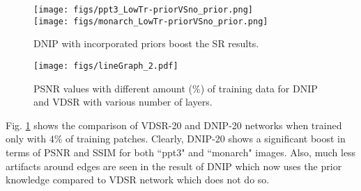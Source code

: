 \documentclass[9pt]{article}
\begin{document}
\begin{figure}[t!]
  \centering
  \texttt{[image: figs/ppt3\_LowTr-priorVSno\_prior.png]}\\
  \texttt{[image: figs/monarch\_LowTr-priorVSno\_prior.png]}\vspace{-0.15in}
  \caption{DNIP with incorporated priors boost the SR results.}\vspace{-0.17in}
  \label{Fig:VDSR_DNIP_20_4percent}
\end{figure}%
\begin{figure}
  \centering
  \texttt{[image: figs/lineGraph\_2.pdf]}\vspace{-0.15in}
  \caption{PSNR values with different amount ($\%$) of training data for DNIP and VDSR with various number of layers.}\vspace{-0.15in}
  \label{Fig:PSNR_plot_all_layers_all_percentages}
\end{figure}



Fig. \ref{Fig:VDSR_DNIP_20_4percent} shows the comparison of VDSR-20 and DNIP-20 networks when trained only with $4\%$ of training patches. Clearly, DNIP-20 shows a significant boost in terms of PSNR and SSIM for both ``ppt3" and ``monarch" images. Also, much less artifacts around edges are seen in the result of DNIP which now uses the prior knowledge compared to VDSR network which does not do so.
\end{document}
